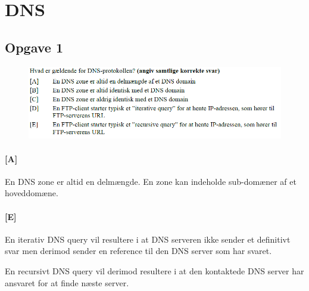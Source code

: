 \section{DNS}

\subsection{Opgave 1}
\begin{figure}[H]
	\centering
	\includegraphics[width=\linewidth]{figs/dns/SE15OP2}
\end{figure}

\paragraph{[A]}
En DNS zone er altid en delmængde. En zone kan indeholde sub-domæner af et hoveddomæne.

\paragraph{[E]}
En iterativ DNS query vil resultere i at DNS serveren ikke sender et definitivt svar men derimod sender en reference til den DNS server som har svaret.

En recursivt DNS query vil derimod resultere i at den kontaktede DNS server har ansvaret for at finde næste server. 
